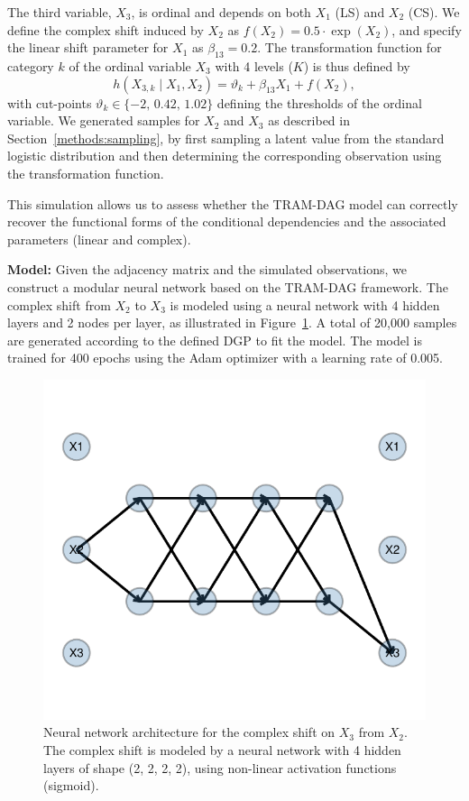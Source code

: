 The third variable, $X_3$, is ordinal and depends on both $X_1$ (LS) and $X_2$ (CS). We define the complex shift induced by $X_2$ as $f(X_2) = 0.5 \cdot \exp(X_2)$, and specify the linear shift parameter for $X_1$ as $\beta_{13} = 0.2$. The transformation function for category $k$ of the ordinal variable $X_3$ with 4 levels ($K$) is thus defined by 
\[
h(X_{3,k} \mid X_1, X_2) = \vartheta_k + \beta_{13} X_1 + f(X_2),
\]
with cut-points $\vartheta_k \in \{-2,\, 0.42,\, 1.02\}$ defining the thresholds of the ordinal variable. We generated samples for $X_2$ and $X_3$ as described in Section~\ref{methods:sampling}, by first sampling a latent value from the standard logistic distribution and then determining the corresponding observation using the transformation function.

This simulation allows us to assess whether the TRAM-DAG model can correctly recover the functional forms of the conditional dependencies and the associated parameters (linear and complex).

\medskip

\textbf{Model:} Given the adjacency matrix and the simulated observations, we construct a modular neural network based on the TRAM-DAG framework. The complex shift from $X_2$ to $X_3$ is modeled using a neural network with 4 hidden layers and 2 nodes per layer, as illustrated in Figure~\ref{fig:exp1_CS}. A total of 20,000 samples are generated according to the defined DGP to fit the model. The model is trained for 400 epochs using the Adam optimizer \citep{kingma2015} with a learning rate of 0.005.



\begin{figure}[H]
\centering
\includegraphics[width=0.5\linewidth]{img/exp1_CS.pdf}
\caption{Neural network architecture for the complex shift on $X_3$ from $X_2$. The complex shift is modeled by a neural network with 4 hidden layers of shape (2, 2, 2, 2), using non-linear activation functions (sigmoid).}
\label{fig:exp1_CS}
\end{figure}




